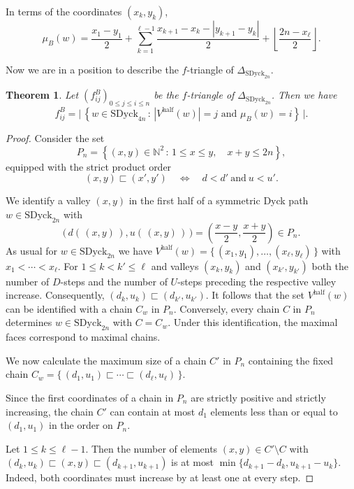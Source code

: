 \documentclass[11pt]{amsart}
\def\half{\mathrm{half}}
\def\SDyck{\mathrm{SDyck}}
\theoremstyle{plain}
\numberwithin{lemma}{\DefaultNumberTheoremWithin}
\newtheorem{theorem}{Theorem}
\numberwithin{theorem}{\DefaultNumberTheoremWithin}
\numberwithin{corollary}{\DefaultNumberTheoremWithin}
\numberwithin{proposition}{\DefaultNumberTheoremWithin}
\numberwithin{conjecture}{\DefaultNumberTheoremWithin}
\theoremstyle{definition}
\numberwithin{definition}{\DefaultNumberTheoremWithin}
\numberwithin{question}{\DefaultNumberTheoremWithin}
\numberwithin{problem}{\DefaultNumberTheoremWithin}
\theoremstyle{remark}
\numberwithin{remark}{\DefaultNumberTheoremWithin}
\numberwithin{example}{\DefaultNumberTheoremWithin}
\numberwithin{claim}{\DefaultNumberTheoremWithin}
\begin{document}
In terms of the coordinates $(x_k,y_k)$,
\[
\mu_B(w)
=
\frac{x_1-y_1}{2}
+
\sum_{k=1}^{\ell-1}
\frac{x_{k+1}-x_k-|y_{k+1}-y_k|}{2}
+
\left\lfloor\frac{2n-x_\ell}{2}\right\rfloor.
\tag{5.2}
\]

Now we are in a position to describe the $f$-triangle of $\Delta_{\SDyck_{2n}}$.

\begin{theorem}\label{thm:typeB-f}
Let
$(f^B_{ij})_{0\leq j\leq i\leq n}$
be the $f$-triangle of $\Delta_{\SDyck_{2n}}$. Then we have 
\[
f^B_{ij}
=
\Big|\,\left\{
w\in\SDyck_{4n}
\,:\,
|V^{\half}(w)|=j
\text{ and }
\mu_B(w)=i
\right\}\,\Big|.
\]
\end{theorem}

\begin{proof}
Consider the set
\[
P_n=\left\{(x,y)\in\mathbb{N}^2\,:\,1\leq x\leq y,\quad x+y\leq2n
\right\},
\]
equipped with the strict product order
\[
(x,y)\sqsubset (x',y')
\quad\Longleftrightarrow\quad
d<d'
\ \text{and}\
u<u'.
\]

We identify a valley $(x,y)$ in the first half of a symmetric Dyck path $w \in \SDyck_{2n}$
with 
\[
\big(\,d(\,(x,y)\,),u(\,(x,y)\,)\,\big)
=
\left(\frac{x-y}{2},\frac{x+y}{2}\right)
\in P_n.
\]
As usual for $w \in \SDyck_{2n}$ we have
$V^{\half}(w) = \big\{\, (x_1,y_1),\ldots,(x_\ell,y_\ell)\,\big\}$ with $x_1 < \cdots < x_\ell$.
For $1 \leq k < k' \leq \ell$ and valleys $(x_k,y_k)$ and $(x_{k'},y_{k'})$ both
the number of $D$-steps and the number of $U$-steps preceding the respective valley increase.
Consequently,
$(d_k,u_k)\sqsubset (d_{k'},u_{k'}).$
It follows that the set $V^{\half}(w)$ can be identified
with a chain $C_w$ in $P_n$. Conversely, every chain $C$ in $P_n$
determines $w \in {\SDyck_{2n}}$ with $C = C_w$. Under this
identification, the maximal faces correspond to maximal chains.

We now calculate the maximum size of a chain $C'$ in $P_n$ containing
the fixed chain
$C_w=\big\{\,(d_1,u_1) \sqsubset \cdots \sqsubset (d_\ell,u_\ell)\,\big\}.$

Since the first coordinates of a chain in $P_n$ are strictly positive and strictly increasing, the chain $C'$ can contain at most $d_1$ elements less than or equal to 
$(d_1,u_1)$ in the order on $P_n$. 

Let $1 \leq k \leq \ell-1$. Then the number of elements $(x,y) \in C' \setminus C$ with $(d_k,u_k)  \sqsubset (x,y) \sqsubset (d_{k+1},u_{k+1})$ is 
 at most
$\min\{d_{k+1}-d_k,u_{k+1}-u_k\}.$
Indeed, both coordinates must increase by at least one at every
step.


\end{proof}
\end{document}
